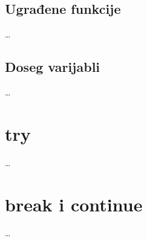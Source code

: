 \subsection{Ugrađene funkcije}

\dots

\subsection{Doseg varijabli}

\dots

\section{try}

\dots

\section{break i continue}

\dots

